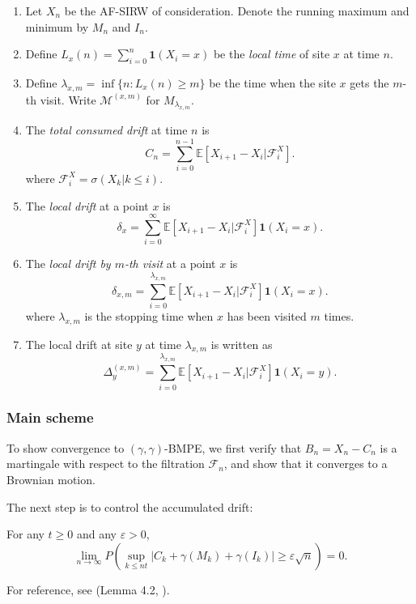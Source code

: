 \begin{enumerate}
	\item 
Let $X_n$ be the AF-SIRW of consideration. Denote the running maximum and minimum by $M_n$ and $I_n$.

\item Define $L_x(n) = \sum_{i = 0}^{n} \mathbf{1}(X_i = x)$ be the \textit{local time} of site $x$ at time $n$.

\item Define $\lambda_{x, m} = \inf \{n: L_x(n) \ge m\} $ be the time when the site $x$ gets the $m$-th visit.
Write $\mathcal{M}^{(x,m)}$ for $M_{\lambda_{x, m}}$.
	\item The \textit{total consumed drift} at time $n$ is
		\[
	C_n = \sum_{i=0}^{n-1} \mathbb{E}\left[ X_{i+1} - X_i | \mathcal{F}_i^X \right] 
		.\] 
where $\mathcal{F}_i^X = \sigma\left( X_k | k \le i \right) $.

	\item 
The \textit{local drift} at a point $x$ is
\[
\delta_{x} = \sum_{i=0}^{\infty} \mathbb{E}\left[ X_{i+1} - X_i | \mathcal{F}_i^X \right] 
\mathbf{1}\left( X_i = x \right) 
.\] 

\item
The \textit{local drift by $m$-th visit} at a point $x$ is
\[
\delta_{x,m} = \sum_{i=0}^{\lambda_{x, m}} \mathbb{E}\left[ X_{i+1} - X_i | \mathcal{F}_i^X \right] 
\mathbf{1}\left( X_i = x \right) 
.\]
where $\lambda_{x,m}$ is the stopping time when $x$ has been visited $m$ times.

\item The local drift at site $y$ at time $\lambda_{x, m}$ is written as
	\[
		\Delta_y^{(x,m)} = \sum_{i=0}^{\lambda_{x, m}} \mathbb{E}\left[ X_{i+1} - X_i | \mathcal{F}_i^X \right] \mathbf{1}(X_i = y)
	.\] 

\end{enumerate}
\subsubsection{Main scheme}


 To show convergence to $(\gamma, \gamma)$-BMPE, we first verify that $B_n = X_n - C_n$ is a martingale with respect to the filtration $\mathcal{F}_n$, and show that it converges to a Brownian motion.

The next step is to control the accumulated drift:

\begin{lemma}
	For any $t \ge 0$ and any $\varepsilon>0$,
	\[
		\lim_{n \to \infty } P\left( 
		\sup_{k \le n t}
		\left| C_k + \gamma(M_k) + \gamma(I_k) \right| 
		\ge \varepsilon \sqrt{n} 
	\right)  =0
	.\] 
\end{lemma}
For reference, see (Lemma 4.2, \cite{kosyginaFunctionalLimitLaws2016}).

